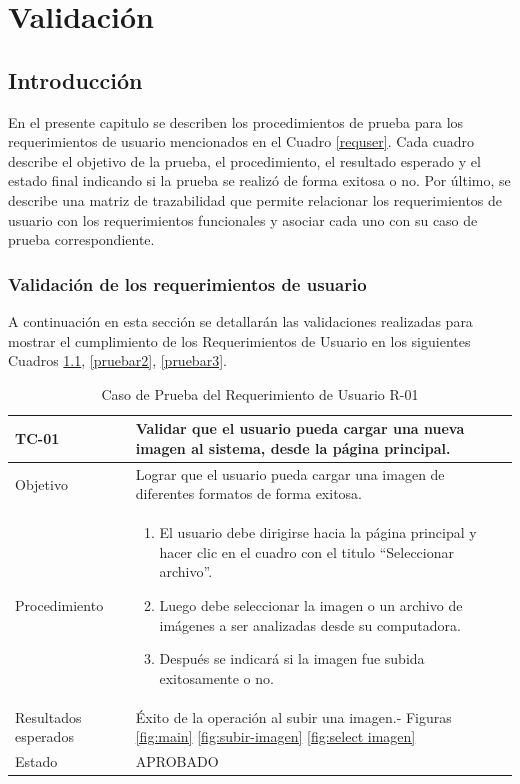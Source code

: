 \chapter{Validación}
\label{Validacion}

\section{Introducción}
En el presente capitulo se describen los procedimientos de prueba para los requerimientos de usuario mencionados en el Cuadro \ref{requser}. Cada cuadro describe el objetivo de la prueba, el procedimiento, el resultado esperado y el estado final indicando si la prueba se realizó de forma exitosa o no. Por último, se describe una matriz de trazabilidad que permite relacionar los requerimientos de usuario con los requerimientos funcionales y asociar cada uno con su caso de prueba correspondiente.


\subsection{Validación de los requerimientos de usuario}

A continuación en esta sección se detallarán las validaciones realizadas para mostrar el cumplimiento de los Requerimientos de Usuario en los siguientes Cuadros \ref{pruebar1}, \ref{pruebar2}, \ref{pruebar3}.

\begin{table}[h!]
    \begin{tabular}{ | p{3cm} |p{9cm}| }
        \hline
        \rowcolor[HTML]{d6d8ff}
        TC-01 & Validar que el usuario pueda cargar una nueva imagen al sistema, desde la página principal.\\
        \hline
        Objetivo & Lograr que el usuario pueda cargar una imagen de diferentes formatos de forma exitosa.\\
        \hline
        Procedimiento & \begin{enumerate}
            \item El usuario debe dirigirse hacia la página principal y hacer clic en el
        cuadro con el titulo “Seleccionar archivo”.
            \item Luego debe seleccionar la imagen o un archivo de imágenes a ser analizadas desde su computadora.
            \item Después se indicará si la imagen fue subida exitosamente o no.
        \end{enumerate}\\
        \hline
        Resultados esperados & Éxito de la operación al subir una imagen.- Figuras \ref{fig:main} \ref{fig:subir-imagen} \ref{fig:select imagen}\\
        \hline
        Estado & APROBADO \\
        \hline
    \end{tabular}\\
    \caption{Caso de Prueba del Requerimiento de Usuario R-01}
    \label{pruebar1}
\end{table}

